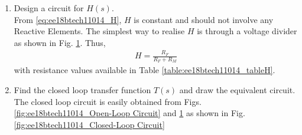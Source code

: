 \begin{enumerate}[label=\thesection.\arabic*.,ref=\thesection.\theenumi]
%
\item Design a circuit for $H(s)$.
\\
\solution From \eqref{eq:ee18btech11014_H}, $H$ is constant and should not involve any Reactive Elements. The simplest way to realise $H$ is through a voltage divider as shown in Fig. 	\ref{fig:ee18btech11014_Feedback Circuit}.  Thus, 
\begin{align}
H = \frac{R_{F}}{R_{F} + R_{M}} 
\end{align}
with resistance values  available in Table \ref{table:ee18btech11014_tableH}.
%
\begin{figure}[ht!]
	\begin{center}
		\resizebox{\columnwidth/2}{!}{}
	\end{center}
	\caption{}
	\label{fig:ee18btech11014_Feedback Circuit}
\end{figure}
%
\begin{table}[!ht]
\centering

\caption{}
\label{table:ee18btech11014_tableH}
\end{table}

\item  Find the closed loop transfer function $T(s)$ and draw the equivalent circuit.
\\
\solution The closed loop circuit is easily obtained from Figs. 		\ref{fig:ee18btech11014_Open-Loop Circuit}
 and \ref{fig:ee18btech11014_Feedback Circuit} as shown in Fig. 	\ref{fig:ee18btech11014_Closed-Loop Circuit}



\end{enumerate}
